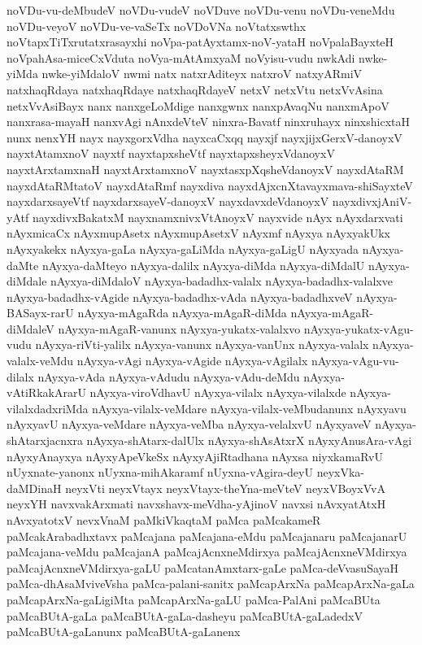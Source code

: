 {noVDu-vu-deMbudeV
noVDu-vudeV
noVDuve
noVDu-venu
noVDu-veneMdu
noVDu-veyoV
noVDu-ve-vaSeTx
noVDoVNa
noVtatxswthx
noVtapxTiTxrutatxrasayxhi
noVpa-patAyxtamx-noV-yataH
noVpalaBayxteH
noVpahAsa-miceCxVduta
noVya-mAtAmxyaM
noVyisu-vudu
nwkAdi
nwke-yiMda
nwke-yiMdaloV
nwmi
natx
natxrAditeyx
natxroV
natxyARmiV
natxhaqRdaya
natxhaqRdaye
natxhaqRdayeV
netxV
netxVtu
netxVvAsina
netxVvAsiBayx
nanx
nanxgeLoMdige
nanxgwnx
nanxpAvaqNu
nanxmApoV
nanxrasa-mayaH
nanxvAgi
nAnxdeVteV
ninxra-Bavatf
ninxruhayx
ninxshicxtaH
nunx
nenxYH
nayx
nayxgorxVdha
nayxcaCxqq
nayxjf
nayxjijxGerxV-danoyxV
nayxtAtamxnoV
nayxtf
nayxtapxsheVtf
nayxtapxsheyxVdanoyxV
nayxtArxtamxnaH
nayxtArxtamxnoV
nayxtasxpXqsheVdanoyxV
nayxdAtaRM
nayxdAtaRMtatoV
nayxdAtaRmf
nayxdiva
nayxdAjxcnXtavayxmava-shiSayxteV
nayxdarxsayeVtf
nayxdarxsayeV-danoyxV
nayxdavxdeVdanoyxV
nayxdivxjAniV-yAtf
nayxdivxBakatxM
nayxnamxnivxVtAnoyxV
nayxvide
nAyx
nAyxdarxvati
nAyxmicaCx
nAyxmupAsetx
nAyxmupAsetxV
nAyxmf
nAyxya
nAyxyakUkx
nAyxyakekx
nAyxya-gaLa
nAyxya-gaLiMda
nAyxya-gaLigU
nAyxyada
nAyxya-daMte
nAyxya-daMteyo
nAyxya-dalilx
nAyxya-diMda
nAyxya-diMdalU
nAyxya-diMdale
nAyxya-diMdaloV
nAyxya-badadhx-valalx
nAyxya-badadhx-valalxve
nAyxya-badadhx-vAgide
nAyxya-badadhx-vAda
nAyxya-badadhxveV
nAyxya-BASayx-rarU
nAyxya-mAgaRda
nAyxya-mAgaR-diMda
nAyxya-mAgaR-diMdaleV
nAyxya-mAgaR-vanunx
nAyxya-yukatx-valalxvo
nAyxya-yukatx-vAgu-vudu
nAyxya-riVti-yalilx
nAyxya-vanunx
nAyxya-vanUnx
nAyxya-valalx
nAyxya-valalx-veMdu
nAyxya-vAgi
nAyxya-vAgide
nAyxya-vAgilalx
nAyxya-vAgu-vu-dilalx
nAyxya-vAda
nAyxya-vAdudu
nAyxya-vAdu-deMdu
nAyxya-vAtiRkakArarU
nAyxya-viroVdhavU
nAyxya-vilalx
nAyxya-vilalxde
nAyxya-vilalxdadxriMda
nAyxya-vilalx-veMdare
nAyxya-vilalx-veMbudanunx
nAyxyavu
nAyxyavU
nAyxya-veMdare
nAyxya-veMba
nAyxya-velalxvU
nAyxyaveV
nAyxya-shAtarxjacnxra
nAyxya-shAtarx-dalUlx
nAyxya-shAsAtxrX
nAyxyAnusAra-vAgi
nAyxyAnayxya
nAyxyApeVkeSx
nAyxyAjiRtadhana
nAyxsa
niyxkamaRvU
nUyxnate-yanonx
nUyxna-mihAkaramf
nUyxna-vAgira-deyU
neyxVka-daMDinaH
neyxVti
neyxVtayx
neyxVtayx-theYna-meVteV
neyxVBoyxVvA
neyxYH
navxvakArxmati
navxshavx-meVdha-yAjinoV
navxsi
nAvxyatAtxH
nAvxyatotxV
nevxVnaM
paMkiVkaqtaM
paMca
paMcakameR
paMcakArabadhxtavx
paMcajana
paMcajana-eMdu
paMcajanaru
paMcajanarU
paMcajana-veMdu
paMcajanA
paMcajAcnxneMdirxya
paMcajAcnxneVMdirxya
paMcajAcnxneVMdirxya-gaLU
paMcatanAmxtarx-gaLe
paMca-deVvasuSayaH
paMca-dhAsaMviveVsha
paMca-palani-sanitx
paMcapArxNa
paMcapArxNa-gaLa
paMcapArxNa-gaLigiMta
paMcapArxNa-gaLU
paMca-PalAni
paMcaBUta
paMcaBUtA-gaLa
paMcaBUtA-gaLa-dasheyu
paMcaBUtA-gaLadedxV
paMcaBUtA-gaLanunx
paMcaBUtA-gaLanenx
}
